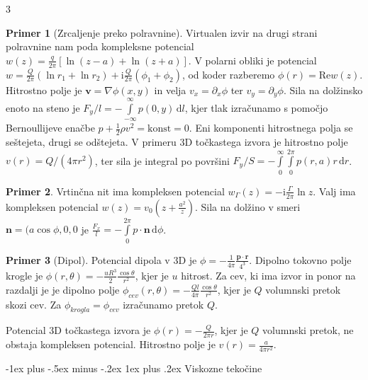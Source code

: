 \documentclass[10pt,landscape]{article}
\makeatletter
\renewcommand{\subsubsection}{\@startsection{subsubsection}{3}{0mm}%
	{-1ex plus -.5ex minus -.2ex}%
	{1ex plus .2ex}%
	{\normalfont\small\bfseries}}
\theoremstyle{definition}
\newtheorem*{primer}{Primer}
\makeatother
\begin{document}
\begin{multicols}{3}
  \begin{primer}[Zrcaljenje preko polravnine]
    Virtualen izvir na drugi strani polravnine nam poda kompleksne potencial \( w(z) = \frac{q}{2 \pi} \left[ \ln (z - a) + \ln (z + a) \right] \). V polarni obliki je potencial \( w = \frac{Q}{2 \pi} \left( \ln r_1 + \ln r_2 \right) + \mathrm{i} \frac{Q}{2 \pi} \left( \phi_1 + \phi_2 \right) \), od koder razberemo \( \phi(r) = \mathrm{Re} w(z) \). Hitrostno polje je \( \mathbf{v} = \nabla \phi(x, y) \) in velja \( v_x = \partial_x \phi \) ter \( v_y = \partial_y \phi \). Sila na dolžinsko enoto na steno je \( F_y / l = - \int\limits_{- \infty}^{\infty} p (0, y) \, \mathrm{d} l \), kjer tlak izračunamo s pomočjo Bernoullijeve enačbe \( p + \frac{1}{2} \rho v ^2 = \mathrm{konst} = 0 \). Eni komponenti hitrostnega polja se seštejeta, drugi se odštejeta. V primeru 3D točkastega izvora je hitrostno polje \( v(r) = Q / (4 \pi r ^2) \), ter sila je integral po površini \( F_y / S = - \int\limits_0^{\infty} \int\limits_0^{2 \pi} p(r, a) r\, \mathrm{d} r \).
  \end{primer}

  \begin{primer}
    Vrtinčna nit ima kompleksen potencial \( w_{\Gamma} (z) = - \mathrm{i} \frac{\Gamma}{2 \pi} \ln z \). Valj ima kompleksen potencial \( w(z) = v_0 \left( z + \frac{a ^2}{z} \right) \). Sila na dolžino v smeri \( \mathbf{n} = (a \cos \phi, 0, 0 \) je \( \frac{F_x}{l} = - \int\limits_0^{2 \pi} p \cdot \mathbf{n} \, \mathrm{d} \phi \).
  \end{primer}

  \begin{primer}[Dipol]
    Potencial dipola v 3D je \( \phi = - \frac{1}{4 \pi} \frac{\mathbf{p} \cdot \mathbf{r}}{4 ^3} \). Dipolno tokovno polje krogle je \( \phi (r, \theta) = - \frac{u R ^3}{2} \frac{\cos \theta}{r ^2} \), kjer je \( u \) hitrost. Za cev, ki ima izvor in ponor na razdalji je je dipolno polje \( \phi_{cev} (r, \theta) = - \frac{Q l}{4 \pi} \frac{\cos \theta}{r ^2} \), kjer je \( Q \) volumnski pretok skozi cev. Za \( \phi_{krogla} = \phi_{cev} \) izračunamo pretok \( Q \).
  \end{primer}

  Potencial 3D točkastega izvora je \( \phi(r) = - \frac{Q}{2 \pi r} \), kjer je \( Q \) volumnski pretok, ne obstaja kompleksen potencial. Hitrostno polje je \( v(r) = \frac{a}{4 \pi r ^2} \). 
  

  \subsubsection{Viskozne tekočine}  


\end{multicols}
\end{document}
